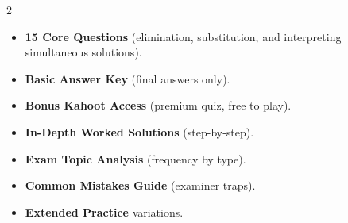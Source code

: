 \documentclass[11pt,a4paper]{article}
\newcommand{\FullReleaseDate}{April 30, 2026}
\begin{document}
\vspace{8pt}

\begin{multicols}{2}
  \begin{tcolorbox}[card, title=\sffamily\bfseries\textcolor{white}{\faHandPointDown\ TODAY (Simplified Version)}, colbacktitle=mainblue, boxed title style={sharp corners, boxrule=0pt}]
    \begin{itemize}[leftmargin=1.2em, itemsep=2pt]
      \item \small \textbf{15 Core Questions} (elimination, substitution, and interpreting simultaneous solutions).
      \item \small \textbf{Basic Answer Key} (final answers only).
      \item \small \textbf{Bonus Kahoot Access} (premium quiz, free to play).
    \end{itemize}
  \end{tcolorbox}

  \columnbreak

  \begin{tcolorbox}[card, title=\sffamily\bfseries\textcolor{white}{\faRocket\ ON \FullReleaseDate\ (Full Upgrade)}, colbacktitle=mainblue, boxed title style={sharp corners, boxrule=0pt}]
    \begin{itemize}[leftmargin=1.2em, itemsep=2pt]
      \item \small \textbf{In-Depth Worked Solutions} (step-by-step).
      \item \small \textbf{Exam Topic Analysis} (frequency by type).
      \item \small \textbf{Common Mistakes Guide} (examiner traps).
      \item \small \textbf{Extended Practice} variations.
    \end{itemize}
  \end{tcolorbox}
\end{multicols}
\end{document}

